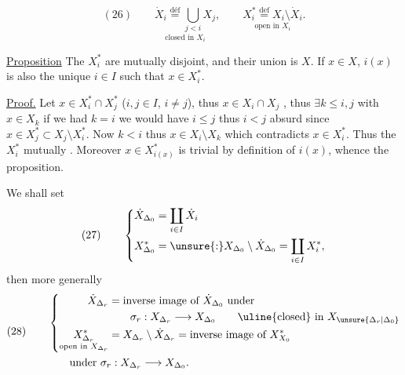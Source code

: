 \[
(26)\qquad
\underset{\text{closed in }X_i}{\dot X_i\overset{\text{déf}}=\bigcup_{j<i}X_j},
\qquad
\underset{\text{open in }X_i}{X_i^*\overset{\mathrm{def}}=X_i\setminus\dot X_i}.
\]


\uline{Proposition} The $X_i^*$ are mutually disjoint, and their union is $X$. If $x\in X$, $i(x)$ is also the unique $i\in I$ such that $x\in X_i^*$.

\uline{Proof.} Let $x\in X_i^*\cap X_j^*$ ($i,j\in I$, $i\ne j$), thus  $x\in X_i\cap X_j$ , thus $\exists k\leq i,j$ with
$x\in X_k$ if we had $k=i$ we would have $i\leq j$ thus $i<j$ absurd since $x\in X_j^*\subset X_j\setminus X_i^*$.
Now $k<i$ thus $x\in X_i\setminus X_k$ which contradicts $x\in X_i^*$. Thus the $X_i^*$ mutually . Moreover $x\in X_{i(x)}^*$ is trivial by definition of $i(x)$, whence the proposition.

We shall set
\[
(27)\qquad
\left\{\begin{aligned}
\dot X_{\Delta_0}&=\coprod_{i\in I}\dot X_i\\
X_{\Delta_0}^*&=\unsure{:}X_{\Delta_0}\setminus\dot X_{\Delta_0}=\coprod_{i\in I}X_i^*,
\end{aligned}\right.
\]
then  more generally
\[
(28)\qquad
\begin{aligned}
&\left\{\begin{aligned}
\dot X_{\Delta_r}&=\text{inverse image of }\dot X_{\Delta_0}\text{ under}\\
&\qquad\sigma_r:X_{\Delta_r}\longrightarrow X_{\Delta_0}
\qquad\text{\uline{closed} in }X_{\unsure{\Delta_r|\Delta_0}}\\
\underset{\text{open in }X_{\Delta_r}}{X_{\Delta_r}^*}&=X_{\Delta_r}\setminus\dot X_{\Delta_r}=\text{inverse image of }X_{X_0}^*
\end{aligned}\right.\\
&\qquad\text{under }\sigma_r:X_{\Delta_r}\longrightarrow X_{\Delta_0}.
\end{aligned}
\]
